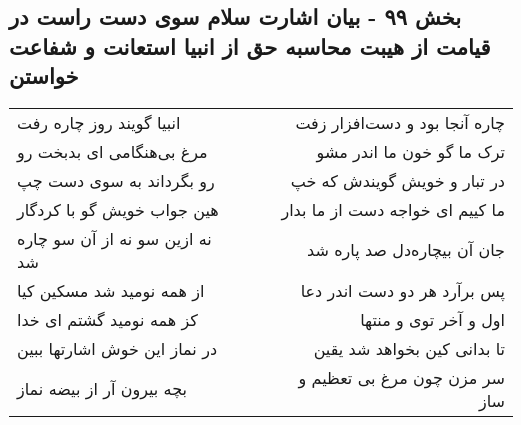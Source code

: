 \begin{center}
\section*{بخش ۹۹ - بیان اشارت سلام سوی دست راست در قیامت از هیبت محاسبه حق از انبیا استعانت  و شفاعت خواستن}
\label{sec:sh099}
\begin{longtable}{l p{0.5cm} r}
انبیا گویند روز چاره رفت
&&
چاره آنجا بود و دست‌افزار زفت
\\
مرغ بی‌هنگامی ای بدبخت رو
&&
ترک ما گو خون ما اندر مشو
\\
رو بگرداند به سوی دست چپ
&&
در تبار و خویش گویندش که خپ
\\
هین جواب خویش گو با کردگار
&&
ما کییم ای خواجه دست از ما بدار
\\
نه ازین سو نه از آن سو چاره شد
&&
جان آن بیچاره‌دل صد پاره شد
\\
از همه نومید شد مسکین کیا
&&
پس برآرد هر دو دست اندر دعا
\\
کز همه نومید گشتم ای خدا
&&
اول و آخر توی و منتها
\\
در نماز این خوش اشارتها ببین
&&
تا بدانی کین بخواهد شد یقین
\\
بچه بیرون آر از بیضه نماز
&&
سر مزن چون مرغ بی تعظیم و ساز
\\
\end{longtable}
\end{center}
